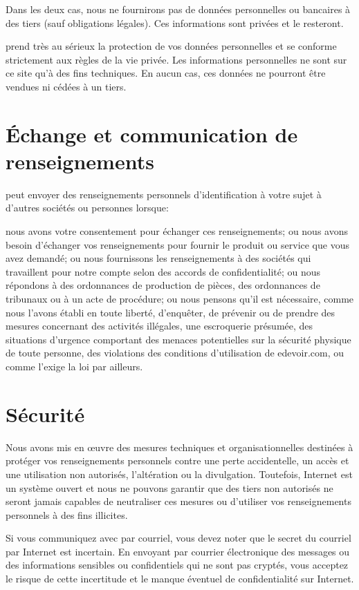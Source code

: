 Dans les deux cas, nous ne fournirons pas de données personnelles ou bancaires à des tiers (sauf obligations légales). Ces informations sont privées et le resteront.

\eDevoir prend très au sérieux la protection de vos données personnelles et se conforme strictement aux règles de la vie privée. Les informations personnelles ne sont sur ce site qu'à des fins techniques. En aucun cas, ces données ne pourront être vendues ni cédées à un tiers.

\section{Échange et communication de renseignements}

\eDevoir peut envoyer des renseignements personnels d'identification à votre sujet à d'autres sociétés ou personnes lorsque:
\begin{itemize}
	\li nous avons votre consentement pour échanger ces renseignements; ou
	\li nous avons besoin d'échanger vos renseignements pour fournir le produit ou service que vous avez demandé; ou
	\li nous fournissons les renseignements à des sociétés qui travaillent pour notre compte selon des accords de confidentialité; ou
	\li nous répondons à des ordonnances de production de pièces, des ordonnances de tribunaux ou à un acte de procédure; ou
	\li nous pensons qu'il est nécessaire, comme nous l'avons établi en toute liberté, d'enquêter, de prévenir ou de prendre des mesures concernant des activités illégales, une escroquerie présumée, des situations d'urgence comportant des menaces potentielles sur la sécurité physique de toute personne, des violations des conditions d'utilisation de edevoir.com, ou comme l'exige la loi par ailleurs.
\end{itemize}

\section{Sécurité}

Nous avons mis en œuvre des mesures techniques et organisationnelles destinées à protéger vos renseignements personnels contre une perte accidentelle, un accès et une utilisation non autorisés, l'altération ou la divulgation. Toutefois, Internet est un système ouvert et nous ne pouvons garantir que des tiers non autorisés ne seront jamais capables de neutraliser ces mesures ou d'utiliser vos renseignements personnels à des fins illicites.

Si vous communiquez avec \eDevoir par courriel, vous devez noter que le secret du courriel par Internet est incertain. En envoyant par courrier électronique des messages ou des informations sensibles ou confidentiels qui ne sont pas cryptés, vous acceptez le risque de cette incertitude et le manque éventuel de confidentialité sur Internet.

